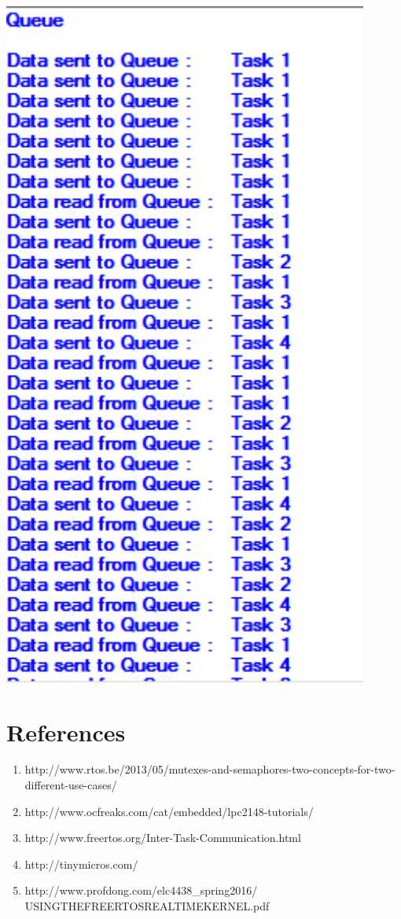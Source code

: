 \documentclass[11pt,a4paper]{article}
\begin{document}
	\includegraphics[width=12cm]{q}
	
	\newpage
	\section{References}
	\begin{enumerate}
	\item  http://www.rtos.be/2013/05/mutexes-and-semaphores-two-concepts-for-two-different-use-cases/
	
	\item http://www.ocfreaks.com/cat/embedded/lpc2148-tutorials/
	\item http://www.freertos.org/Inter-Task-Communication.html
	\item http://tinymicros.com/
	\item http://www.profdong.com/elc4438\_spring2016/\\USINGTHEFREERTOSREALTIMEKERNEL.pdf
	\end{enumerate}	
	
\end{document}
